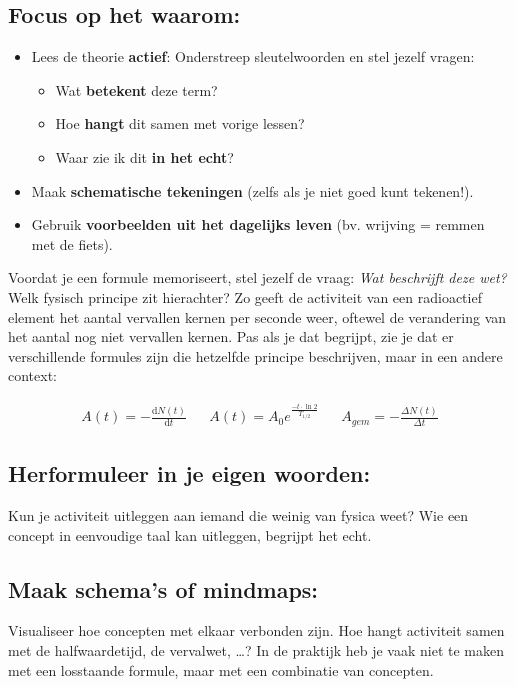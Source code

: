 \documentclass{ximera}
\begin{document}
\subsection*{Focus op het waarom:}  
\begin{itemize}
    \item Lees de theorie \textbf{actief}: Onderstreep sleutelwoorden en stel jezelf vragen:
    \begin{itemize}
        \item Wat \textbf{betekent} deze term?
        \item Hoe \textbf{hangt} dit samen met vorige lessen?
        \item Waar zie ik dit \textbf{in het echt}?
    \end{itemize}
    \item Maak \textbf{schematische tekeningen} (zelfs als je niet goed kunt tekenen!).
    \item Gebruik \textbf{voorbeelden uit het dagelijks leven} (bv. wrijving = remmen met de fiets).
\end{itemize}
Voordat je een formule memoriseert, stel jezelf de vraag: \textit{Wat beschrijft deze wet?}  
Welk fysisch principe zit hierachter?  
Zo geeft de activiteit van een radioactief element het aantal vervallen kernen per seconde weer, oftewel de verandering van het aantal nog niet vervallen kernen.  
Pas als je dat begrijpt, zie je dat er verschillende formules zijn die hetzelfde principe beschrijven, maar in een andere context:

\begin{align*}
A(t) = -\frac{\mathrm{d}N(t)}{\mathrm{d}t} && A(t) = A_0 e^{\frac{-t\cdot \ln{2}}{T_{1/2}}} && A_{gem} = -\frac{\Delta N(t)}{\Delta t}
\end{align*}

\subsection*{Herformuleer in je eigen woorden:}
Kun je activiteit uitleggen aan iemand die weinig van fysica weet?  
Wie een concept in eenvoudige taal kan uitleggen, begrijpt het echt.

\subsection*{Maak schema's of mindmaps:}
Visualiseer hoe concepten met elkaar verbonden zijn.  
Hoe hangt activiteit samen met de halfwaardetijd, de vervalwet, \dots?
In de praktijk heb je vaak niet te maken met een losstaande formule, maar met een combinatie van concepten.
\end{document}
